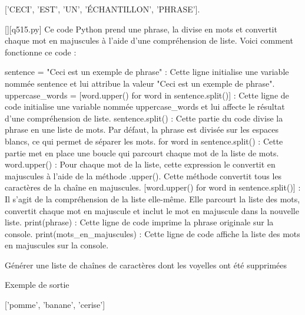 ['CECI', 'EST', 'UN', 'ÉCHANTILLON', 'PHRASE'].
        \par
        \begin{solution}
            \renewcommand{\nomfichier}{q515.py}
            \pythonfile{\chemincode \nomfichier}[][\nomfichier]
            Ce code Python prend une phrase, la divise en mots et convertit chaque mot en majuscules à l'aide d'une compréhension de liste. Voici comment fonctionne ce code :

    sentence = "Ceci est un exemple de phrase" : Cette ligne initialise une variable nommée sentence et lui attribue la valeur "Ceci est un exemple de phrase".
    uppercase_words = [word.upper() for word in sentence.split()] : Cette ligne de code initialise une variable nommée uppercase_words et lui affecte le résultat d'une compréhension de liste.
        sentence.split() : Cette partie du code divise la phrase en une liste de mots. Par défaut, la phrase est divisée sur les espaces blancs, ce qui permet de séparer les mots.
        for word in sentence.split() : Cette partie met en place une boucle qui parcourt chaque mot de la liste de mots.
        word.upper() : Pour chaque mot de la liste, cette expression le convertit en majuscules à l'aide de la méthode .upper(). Cette méthode convertit tous les caractères de la chaîne en majuscules.
        [word.upper() for word in sentence.split()] : Il s'agit de la compréhension de la liste elle-même. Elle parcourt la liste des mots, convertit chaque mot en majuscule et inclut le mot en majuscule dans la nouvelle liste.
    print(phrase) : Cette ligne de code imprime la phrase originale sur la console.
    print(mots_en_majuscules) : Cette ligne de code affiche la liste des mots en majuscules sur la console.
        \end{solution}
        

        \question
        Générer une liste de chaînes de caractères dont les voyelles ont été supprimées

Exemple de sortie

['pomme', 'banane', 'cerise']

